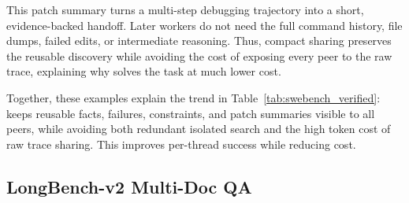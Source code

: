 This patch summary turns a multi-step debugging trajectory into a short,
evidence-backed handoff. Later workers do not need the full command history, file dumps, failed edits, or intermediate reasoning. Thus, compact sharing preserves the reusable discovery while avoiding the cost of exposing every peer to the raw trace, explaining why \toolName{} solves the task at much lower cost.

 
Together, these examples explain the trend in Table~\ref{tab:swebench_verified}: \toolName{} keeps reusable facts, failures, constraints, and patch summaries visible to all peers, while avoiding both redundant isolated search and the high token cost of raw trace sharing. This improves per-thread success while reducing cost.

\subsection{LongBench-v2 Multi-Doc QA}
\label{sec:longbench}
